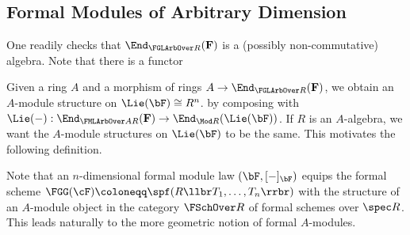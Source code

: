 \subsection{Formal Modules of Arbitrary Dimension} %
\label{sub:Formal Modules of Arbitrary Dimension}
  
One readily checks that $\End_{\FGLArbOver R}(\mathbf F)$ is a (possibly 
non-commutative) algebra. Note that there is 
a functor 

Given a ring $A$ and a morphism of rings
$A \to \End_{\FGLArbOver R}(\mathbf F)$, we obtain an $A$-module structure on 
$\Lie(\bF) \cong R^n$. by composing with $\Lie(-): \End_{\FMLArbOver A
R}(\mathbf F) \to \End_{\Mod R}(\Lie(\bF))$. If $R$ is an $A$-algebra, we want the 
$A$-module structures on $\Lie(\bF)$ to be the same. This motivates the following 
definition.

Note that an $n$-dimensional formal module law $(\bF, [-]_\bF)$ equips the 
formal scheme $\FGG(\cF) \coloneqq \spf(R \llbr T_1, \dots, T_n\rrbr)$ with the
structure of an $A$-module object in the category $\FSchOver R$ of formal
schemes over $\spec R$. This leads naturally to the more geometric notion of 
formal $A$-modules.








